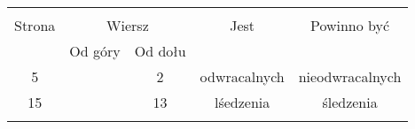 \documentclass[a4paper,11pt]{article}
\begin{document}
\begin{center}
  \begin{tabular}{|c|c|c|c|c|}
    \hline
    & \multicolumn{2}{c|}{} & & \\
    Strona & \multicolumn{2}{c|}{Wiersz} & Jest & Powinno być
    \\ \cline{2-3}
    & Od góry & Od dołu &  &  \\ \hline
    5 & & 2 & odwracalnych & nieodwracalnych \\
    15 & & 13 & lśedzenia & śledzenia \\
    & & & & \\ \hline
  \end{tabular}
\end{center}










{}






\end{document}
